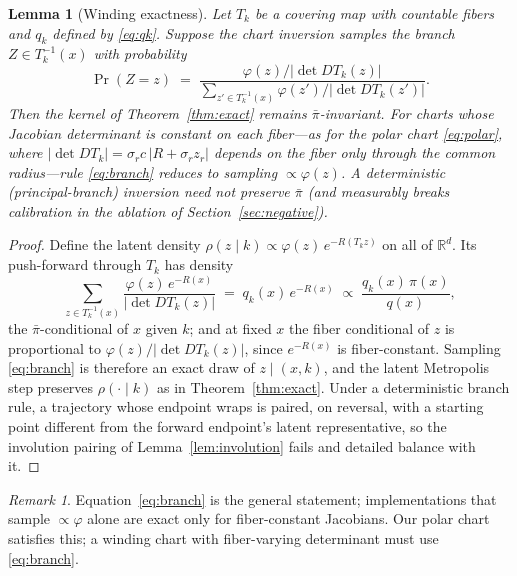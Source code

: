 \documentclass[11pt]{article}
\newtheorem{lemma}{Lemma}
\theoremstyle{remark}
\newtheorem{remark}{Remark}
\newcommand{\R}{\mathbb{R}}
\begin{document}
\begin{lemma}[Winding exactness]\label{lem:winding}
Let $T_k$ be a covering map with countable fibers and $q_k$ defined by
\eqref{eq:qk}. Suppose the chart inversion samples the branch
$Z\in T_k^{-1}(x)$ with probability
\begin{equation}
\Pr(Z=z)\;=\;
\frac{\varphi(z)/\lvert\det DT_k(z)\rvert}
{\sum_{z'\in T_k^{-1}(x)}\varphi(z')/\lvert\det DT_k(z')\rvert}.
\label{eq:branch}
\end{equation}
Then the kernel of Theorem~\ref{thm:exact} remains $\bar\pi$-invariant.
For charts whose Jacobian determinant is constant on each fiber---as for
the polar chart \eqref{eq:polar}, where
$\lvert\det DT_k\rvert=\sigma_rc\,\lvert R+\sigma_rz_r\rvert$ depends on
the fiber only through the common radius---rule \eqref{eq:branch} reduces
to sampling $\propto\varphi(z)$. A deterministic (principal-branch)
inversion need not preserve $\bar\pi$ (and measurably breaks
calibration in the ablation of Section~\ref{sec:negative}).
\end{lemma}
\begin{proof}
Define the latent density
$\rho(z\mid k)\propto\varphi(z)\,e^{-R(T_kz)}$ on all of $\R^d$. Its
push-forward through $T_k$ has density
\begin{equation*}
\sum_{z\in T_k^{-1}(x)}
\frac{\varphi(z)\,e^{-R(x)}}{\lvert\det DT_k(z)\rvert}
\;=\;q_k(x)\,e^{-R(x)}
\;\propto\;\frac{q_k(x)\,\pi(x)}{q(x)},
\end{equation*}
the $\bar\pi$-conditional of $x$ given $k$; and at fixed $x$ the fiber
conditional of $z$ is proportional to
$\varphi(z)/\lvert\det DT_k(z)\rvert$, since $e^{-R(x)}$ is
fiber-constant. Sampling \eqref{eq:branch} is therefore an exact draw of
$z\mid(x,k)$, and the latent Metropolis step preserves
$\rho(\cdot\mid k)$ as in Theorem~\ref{thm:exact}. Under a deterministic
branch rule, a trajectory whose endpoint wraps is paired, on reversal,
with a starting point different from the forward endpoint's latent
representative, so the involution pairing of Lemma~\ref{lem:involution}
fails and detailed balance with it.
\end{proof}

\begin{remark}
Equation~\eqref{eq:branch} is the general statement; implementations that
sample $\propto\varphi$ alone are exact only for fiber-constant
Jacobians. Our polar chart satisfies this; a winding chart with
fiber-varying determinant must use \eqref{eq:branch}.
\end{remark}
\end{document}

